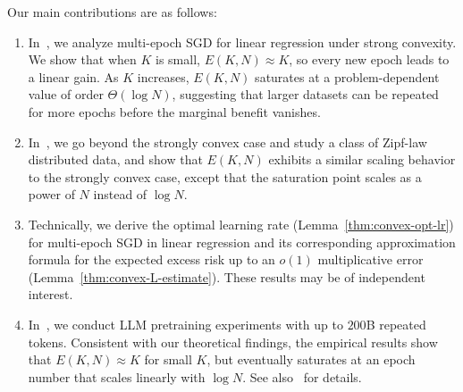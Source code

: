 Our main contributions are as follows:
\begin{enumerate}
\item In~, we analyze multi-epoch SGD for linear regression under strong convexity.
We show that when $K$ is small, $E(K, N) \approx K$, so every new epoch leads to a linear gain. As $K$ increases, $E(K, N)$ saturates at a problem-dependent value of order $\Theta(\log N)$, suggesting that larger datasets can be repeated for more epochs before the marginal benefit vanishes.

\item In~, we go beyond the strongly convex case and study a class of Zipf-law distributed data, and show that $E(K, N)$ exhibits a similar scaling behavior to the strongly convex case, except that the saturation point scales as a power of $N$ instead of $\log N$.

\item Technically, we derive the optimal learning rate (Lemma~\ref{thm:convex-opt-lr}) for multi-epoch SGD in linear regression and its corresponding approximation formula for the expected excess risk up to an $o(1)$ multiplicative error (Lemma~\ref{thm:convex-L-estimate}). These results may be of independent interest.

\item In~, we conduct LLM pretraining experiments with up to $200$B repeated tokens.
Consistent with our theoretical findings, the empirical results show that $E(K, N) \approx K$ for small $K$, but eventually saturates at an epoch number that scales linearly with $\log N$. 
See also~ for details.
\end{enumerate}

